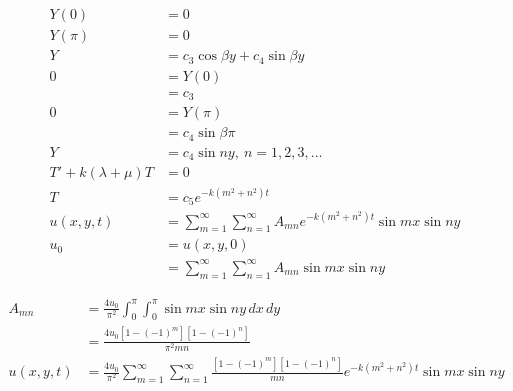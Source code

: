 \documentclass{article}
\begin{document}
\begin{align*}
  Y(0)                     & = 0                                                                                      \\
  Y(\pi)                   & = 0                                                                                      \\
  Y                        & = c_3 \cos \beta y + c_4 \sin \beta y                                                    \\
  0                        & = Y(0)                                                                                   \\
                           & = c_3                                                                                    \\
  0                        & = Y(\pi)                                                                                 \\
                           & = c_4 \sin \beta \pi                                                                     \\
  Y                        & = c_4 \sin n y,\ n = 1, 2, 3, \ldots                                                     \\
  T' + k (\lambda + \mu) T & = 0                                                                                      \\
  T                        & = c_5 e^{-k (m^2 + n^2) t}                                                               \\
  u(x, y, t)               & = \sum_{m = 1}^\infty \sum_{n = 1}^\infty A_{m n} e^{-k (m^2 + n^2) t} \sin m x \sin n y \\
  u_0                      & = u(x, y, 0)                                                                             \\
                           & = \sum_{m = 1}^\infty \sum_{n = 1}^\infty A_{m n} \sin m x \sin n y
\end{align*}

\begin{align*}
  A_{m n}    & = \frac{4 u_0}{\pi^2} \int_0^\pi \int_0^\pi \sin m x \sin n y \,d x \,d y                                                                  \\
             & = \frac{4 u_0 [1 - (-1)^m] [1 - (-1)^n]}{\pi^2 m n}                                                                                        \\
  u(x, y, t) & = \frac{4 u_0}{\pi^2} \sum_{m = 1}^\infty \sum_{n = 1}^\infty \frac{[1 - (-1)^m] [1 - (-1)^n]}{m n} e^{-k (m^2 + n^2) t} \sin m x \sin n y
\end{align*}
\end{document}
